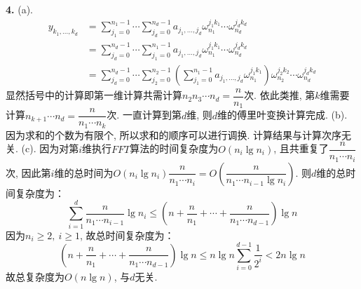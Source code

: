 \documentclass{article}
\begin{document}
	\begin{solution}\textnormal{\textbf{4.}}
		(a). 
		$$
		\begin{aligned}
		y_{k_1, \dots, k_d} &= \sum_{j_1 = 0}^{n_1 - 1} \cdots \sum_{j_d = 0}^{n_d - 1}a_{j_1, \dots, j_d}\omega_{n_1}^{j_1k_1}\cdots \omega_{n_d}^{j_dk_d} \\
		&= \sum_{j_d = 0}^{n_d - 1} \cdots \sum_{j_1 = 0}^{n_1 - 1}a_{j_1, \dots, j_d}\omega_{n_1}^{j_1k_1}\cdots \omega_{n_d}^{j_dk_d} \\
		&= \sum_{j_d = 0}^{n_d - 1} \cdots \sum_{j_2 = 0}^{n_2 - 1}\left(\sum_{j_1 = 0}^{n_1 - 1}a_{j_1, \dots, j_d}\omega_{n_1}^{j_1k_1}\right)\omega_{n_2}^{j_2k_2}\cdots \omega_{n_d}^{j_dk_d}
		\end{aligned}
		$$
		显然括号中的计算即第一维计算共需计算$n_2n_3\cdots n_d = \dfrac{n}{n_1}$次. 依此类推, 第$k$维需要计算$n_{k + 1}\cdots n_d = \dfrac{n}{n_1\cdots n_k}$次. 一直计算到第$d$维, 则$d$维的傅里叶变换计算完成.\newline
		(b). 因为求和的个数为有限个, 所以求和的顺序可以进行调换. 计算结果与计算次序无关.\newline
		(c). 因为对第$i$维执行$FFT$算法的时间复杂度为$O(n_i\lg n_i)$, 且共重复了$\dfrac{n}{n_1\cdots n_i}$次, 因此第$i$维的总时间为$O(n_i\lg n_i)\dfrac{n}{n_1\cdots n_i} = O\left(\dfrac{n}{n_1\cdots n_{i - 1}\lg n_i}\right)$. 则$d$维的总时间复杂度为：
		$$
		\sum_{i = 1}^{d}\dfrac{n}{n_1\cdots n_{i - 1}}\lg n_i \leq \left(n + \dfrac{n}{n_1} + \cdots + \dfrac{n}{n_1\cdots n_{d - 1}}\right)\lg n
		$$
		因为$n_i \geq 2,\ i \geq 1$, 故总时间复杂度为：
		$$
		\left(n + \dfrac{n}{n_1} + \cdots + \dfrac{n}{n_1\cdots n_{d - 1}}\right)\lg n \leq n\lg n \sum_{i = 0}^{d - 1}\dfrac{1}{2^{i}} < 2n\lg n
		$$
		故总复杂度为$O(n\lg n)$, 与$d$无关.
	\end{solution}
\end{document}
